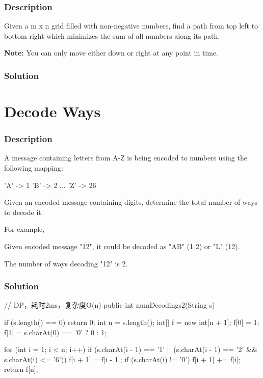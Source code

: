\subsubsection{Description}
Given a m x n grid filled with non-negative numbers, find a path from top left to bottom right which minimizes the sum of all numbers along its path.

\textbf{Note:} You can only move either down or right at any point in time.

\subsubsection{Solution}

\begin{Code}

\end{Code}

\newpage

\section{Decode Ways} %

\subsubsection{Description}
A message containing letters from A-Z is being encoded to numbers using the following mapping:
\begin{Code}
'A' -> 1
'B' -> 2
...
'Z' -> 26
\end{Code}
Given an encoded message containing digits, determine the total number of ways to decode it.

For example,

Given encoded message "12", it could be decoded as "AB" (1 2) or "L" (12).

The number of ways decoding "12" is 2.
\subsubsection{Solution}

\begin{Code}
// DP，耗时2ms，复杂度O(n)
public int numDecodings2(String s) {
    if (s.length() == 0) {
        return 0;
    }
    int n = s.length();
    int[] f = new int[n + 1];
    f[0] = 1;
    f[1] = s.charAt(0) == '0' ? 0 : 1;

    for (int i = 1; i < n; i++) {
        if (s.charAt(i - 1) == '1' || (s.charAt(i - 1) == '2' && s.charAt(i) <= '6')) {
            f[i + 1] = f[i - 1];
        }
        if (s.charAt(i) != '0') {
            f[i + 1] += f[i];
        }
    }
    return f[n];
}
\end{Code}

